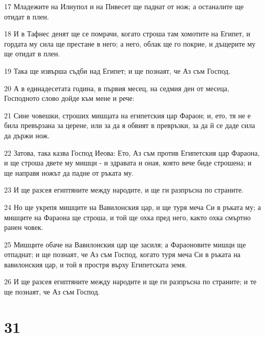 \par 17 Младежите на Илиупол и на Пивесет ще паднат от нож; а останалите ще отидат в плен.
\par 18 И в Тафнес денят ще се помрачи, когато строша там хомотите на Египет, и гордата му сила ще престане в него; а него, облак ще го покрие, и дъщерите му ще отидат в плен.
\par 19 Така ще извърша съдби над Египет; и ще познаят, че Аз съм Господ.
\par 20 А в единадесетата година, в първия месец, на седмия ден от месеца, Господното слово дойде към мене и рече:
\par 21 Сине човешки, строших мишцата на египетския цар Фараон; и, ето, тя не е била превързана за церене, или за да я обвият в превръзки, за да й се даде сила да държи нож.
\par 22 Затова, така казва Господ Иеова: Ето, Аз съм против Египетския цар Фараона, и ще строша двете му мишци - и здравата и оная, която вече биде строшена; и ще направя ножът да падне от ръката му.
\par 23 И ще разсея египтяните между народите, и ще ги разпръсна по страните.
\par 24 Но ще укрепя мишците на Вавилонския цар, и ще туря меча Си в ръката му; а мишците на Фараона ще строша, и той ще охка пред него, както охка смъртно ранен човек.
\par 25 Мишците обаче на Вавилонския цар ще засиля; а Фараоновите мишци ще отпаднат; и ще познаят, че Аз съм Господ, когато туря меча Си в ръката на вавилонския цар, и той я простря върху Египетската земя.
\par 26 И ще разсея египтяните между народите и ще ги разпръсна по страните; и те ще познаят, че Аз съм Господ.

\chapter{31}

